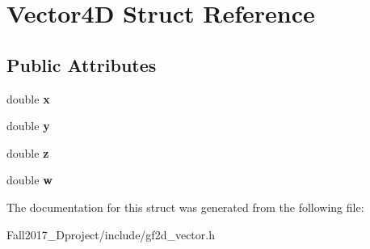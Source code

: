 \hypertarget{struct_vector4_d}{}\section{Vector4D Struct Reference}
\label{struct_vector4_d}
\subsection*{Public Attributes}
\begin{DoxyCompactItemize}
\item 
\mbox{\label{struct_vector4_d_a488967dd3ec5f78102f2deab9e22edcf}} 
double {\bfseries x}
\item 
\mbox{\label{struct_vector4_d_a4953a3dbb1c7d6996992431a672c4af2}} 
double {\bfseries y}
\item 
\mbox{\label{struct_vector4_d_a3bd52a587778beb75abec687589d2551}} 
double {\bfseries z}
\item 
\mbox{\label{struct_vector4_d_a6ee68e5d35b173180e009e580b0b0958}} 
double {\bfseries w}
\end{DoxyCompactItemize}


The documentation for this struct was generated from the following file\+:\begin{DoxyCompactItemize}
\item 
Fall2017\+\_\+Dproject/include/gf2d\+\_\+vector.\+h\end{DoxyCompactItemize}
